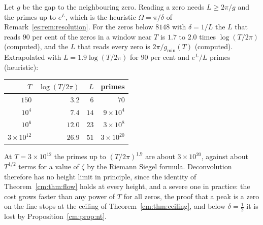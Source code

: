 \begin{remark}\label{cm:rem:resolution}
Let $g$ be the gap to the neighbouring zero. Reading a zero needs $L\ge2\pi/g$ and the primes up to $e^L$, which is the heuristic $\Omega=\pi/\delta$ of Remark~\ref{es:rem:resolution}. For the zeros below $8148$ with $\delta=1/L$ the $L$ that reads $90$ per cent of the zeros in a window near $T$ is $1.7$ to $2.0$ times $\log(T/2\pi)$ (computed), and the $L$ that reads every zero is $2\pi/g_{\min}(T)$ (computed). Extrapolated with $L=1.9\log(T/2\pi)$ for $90$ per cent and $e^L/L$ primes (heuristic):
\begin{center}\small
\begin{tabular}{rrrr}
$T$ & $\log(T/2\pi)$ & $L$ & primes \\
\hline
$150$ & $3.2$ & $6$ & $70$ \\
$10^4$ & $7.4$ & $14$ & $9\times10^4$ \\
$10^6$ & $12.0$ & $23$ & $3\times10^8$ \\
$3\times10^{12}$ & $26.9$ & $51$ & $3\times10^{20}$ \\
\end{tabular}
\end{center}
At $T=3\times10^{12}$ the primes up to $(T/2\pi)^{1.9}$ are about $3\times10^{20}$, against about $T^{1/2}$ terms for a value of $\zeta$ by the Riemann Siegel formula. Deconvolution therefore has no height limit in principle, since the identity of Theorem~\ref{cm:thm:flow} holds at every height, and a severe one in practice: the cost grows faster than any power of $T$ for all zeros, the proof that a peak is a zero on the line stops at the ceiling of Theorem~\ref{cm:thm:ceiling}, and below $\delta=\frac12$ it is lost by Proposition~\ref{cm:prop:nt}.
\end{remark}

